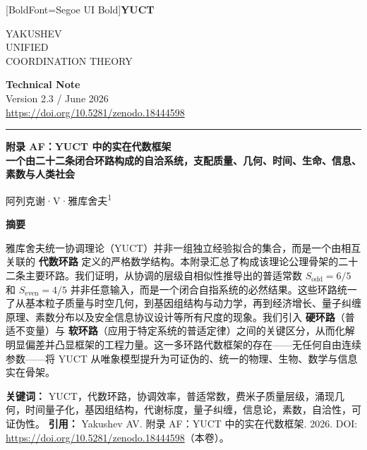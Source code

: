 \documentclass[12pt,a4paper]{article}
\newcommand{\makeheader}{%
	\noindent
	\begin{minipage}{0.17\textwidth}
		\raggedright
		{\fontspec{Segoe UI}[BoldFont=Segoe UI Bold]\bfseries\color{skyblue}\fontsize{46}{46}\selectfont YUCT}%
	\end{minipage}%
	\hspace{30pt}
	\begin{minipage}{0.32\textwidth}
		\raggedright
		{\sffamily\fontsize{11}{13}\selectfont YAKUSHEV\\ UNIFIED\\ COORDINATION THEORY}%
	\end{minipage}%
	\hfill
	\begin{minipage}{0.38\textwidth}
		\raggedleft
		{\sffamily\bfseries Technical Note}\\ 
		{\sffamily Version 2.3 / June 2026}\\ 
		{\sffamily\footnotesize \mbox{\url{https://doi.org/10.5281/zenodo.18444598}}}%
	\end{minipage}
	\par\vspace{5pt}
	\noindent\textcolor{gold}{\rule{\textwidth}{1.6pt}}
	\par\vspace{0pt}
}
\begin{document}
	
	\thispagestyle{firstpage}
	\makeheader
	
	\vspace{0cm}
	{\LARGE\bfseries 附录 AF：YUCT 中的实在代数框架 \\ 
		\Large 一个由二十二条闭合环路构成的自洽系统，支配质量、几何、时间、生命、信息、素数与人类社会 \par}
	\vspace{0.2cm}
	
	{\large 阿列克谢·V·雅库舍夫\textsuperscript{1}} \\
	\vspace{0.0cm}
	
	{\color{darkblue}\textbf{\LARGE 摘要}} \par
	{\large
		\noindent
		雅库舍夫统一协调理论（YUCT）并非一组独立经验拟合的集合，而是一个由相互关联的 \textbf{代数环路} 定义的严格数学结构。本附录汇总了构成该理论公理骨架的二十二条主要环路。我们证明，从协调的层级自相似性推导出的普适常数 \(S_{\mathrm{odd}}=6/5\) 和 \(S_{\mathrm{even}}=4/5\) 并非任意输入，而是一个闭合自指系统的必然结果。这些环路统一了从基本粒子质量与时空几何，到基因组结构与动力学，再到经济增长、量子纠缠原理、素数分布以及安全信息协议设计等所有尺度的现象。我们引入 \textbf{硬环路}（普适不变量）与 \textbf{软环路}（应用于特定系统的普适定律）之间的关键区分，从而化解明显偏差并凸显框架的工程力量。这一多环路代数框架的存在——无任何自由连续参数——将 YUCT 从唯象模型提升为可证伪的、统一的物理、生物、数学与信息实在骨架。}
	
	\vspace{0.1cm}
	\noindent
	{\color{darkblue}\textbf{关键词：}} YUCT，代数环路，协调效率，普适常数，费米子质量层级，涌现几何，时间量子化，基因组结构，代谢标度，量子纠缠，信息论，素数，自洽性，可证伪性。
	\vspace{0.1cm}
	\noindent
	{\color{darkblue}\textbf{引用：}} Yakushev AV. 附录 AF：YUCT 中的实在代数框架. 2026. DOI: \url{https://doi.org/10.5281/zenodo.18444598}（本卷）。
	
	\vspace{0.4cm}
	
\end{document}
